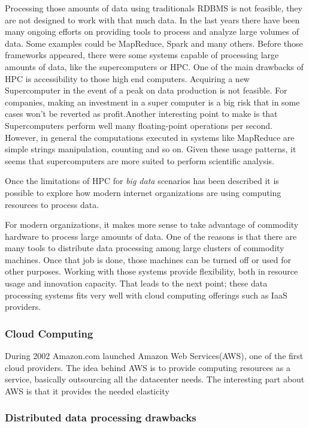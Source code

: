 Processing those amounts of data using traditionals RDBMS is not feasible, they
are not designed to work with that much data. In the last years there have been
many ongoing efforts on providing tools to process and analyze large volumes of
data. Some examples could be MapReduce\cite{mapreduce}, Spark\cite{spark} and
many others. Before those frameworks appeared, there were some systems capable
of processing large amounts of data, like the supercomputers or HPC. One of the
main drawbacks of HPC is accessibility to those high end computers. Acquiring a
new Supercomputer in the event of a peak on data production is not feasible. For
companies, making an investment in a super computer is a big risk that in some
cases won't be reverted as profit.Another interesting point to make is that
Supercomputers perform well many floating-point operations per second. However,
in general the computations executed in systems like MapReduce are simple
strings manipulation, counting and so on. Given these usage patterns, it seems
that supercomputers are more suited to perform scientific analysis.

Once the limitations of HPC for \textit{big data} scenarios has been described
it is possible to explore how modern internet organizations are using computing
resources to process data.

For modern organizations, it makes more sense to take advantage of commodity
hardware to process large amounts of data. One of the reasons is that there are
many tools to distribute data processing among large clusters of commodity
machines. Once that job is done, those machines can be turned off or used for
other purposes. Working with those systems provide flexibility, both in resource
usage and innovation capacity. That leads to the next point; these data
processing systems fits very well with cloud computing offerings such as IaaS
providers.

\subsubsection{Cloud Computing}

During 2002 Amazon.com launched Amazon Web Services(AWS), one of the first cloud
providers. The idea behind AWS is to provide computing resources as a service, basically
outsourcing all the datacenter needs. The interesting part about AWS is that it provides
the needed elasticity 

\subsubsection{Distributed data processing drawbacks}

